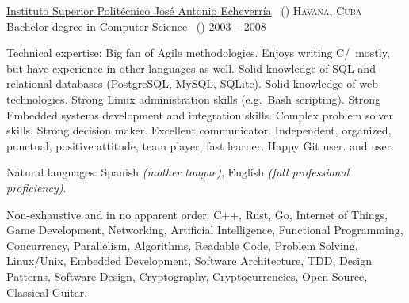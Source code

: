 \documentclass[10pt,a4paper]{article}
\begin{document}
                \headedsection
                        {\href{http://cujae.edu.cu}{Instituto Superior Polit\'ecnico Jos\'e Antonio Echeverr\'ia} \textnormal{~()}}
                        {\textsc{Havana, Cuba}} {%
                            \headedsubsection
                                    {Bachelor degree in Computer Science \textnormal{~()}}
                                    {2003 -- 2008}
                                    {}
                        }

                        \spacedhrule{0.5em}{-0.4em}


                        \inlineheadsection  %
                                {Technical expertise:}
                                {Big fan of Agile methodologies. Enjoys writing C/\nsp\CPP\nsp\, mostly, but have experience in other languages as well. Solid knowledge of SQL and relational databases (PostgreSQL, MySQL, SQLite). Solid knowledge of web technologies. Strong Linux administration skills (e.g.\ Bash scripting). Strong Embedded systems development and integration skills. Complex problem solver skills. Strong decision maker. Excellent communicator. Independent, organized, punctual, positive attitude, team player, fast learner. Happy Git user.  and  user.}

                                \vspace{0.5em}
                                \inlineheadsection
                                        {Natural languages:}
                                        {Spanish \emph{(mother tongue)}, English \emph{(full professional proficiency)}.}

                                        \spacedhrule{1.6em}{-0.4em}


                                        \inlineheadsection
                                                {Non-exhaustive and in no apparent order:}
                                                {C++, Rust, Go, Internet of Things, Game Development, Networking, Artificial Intelligence, Functional Programming, Concurrency, Parallelism, Algorithms, Readable Code, Problem Solving, Linux/Unix, Embedded Development, Software Architecture, TDD, Design Patterns, Software Design, Cryptography, Cryptocurrencies, Open Source, Classical Guitar.}
\end{document}
